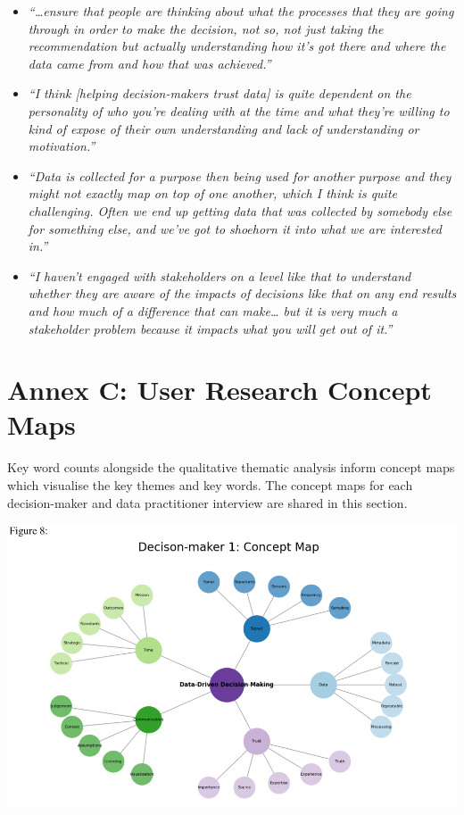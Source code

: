 \documentclass{article}
\begin{document}
\begin{itemize}
{  reduction technique has on the on the decision.''}
\item
  \emph{``\ldots ensure that people are thinking about what the
  processes that they are going through in order to make the decision,
  not so, not just taking the recommendation but actually understanding
  how it's got there and where the data came from and how that was
  achieved.''}
\item
  \emph{``I think {[}helping decision-makers trust data{]} is quite
  dependent on the personality of who you're dealing with at the time
  and what they're willing to kind of expose of their own understanding
  and lack of understanding or motivation.''}
\item
  \emph{``Data is collected for a purpose then being used for another
  purpose and they might not exactly map on top of one another, which I
  think is quite challenging. Often we end up getting data that was
  collected by somebody else for something else, and we've got to
  shoehorn it into what we are interested in.''}
\item
  \emph{``I haven't engaged with stakeholders on a level like that to
  understand whether they are aware of the impacts of decisions like
  that on any end results and how much of a difference that can
  make\ldots{} but it is very much a stakeholder problem because it
  impacts what you will get out of it.''}
\end{itemize}

\newpage

\hypertarget{annex-c-user-research-concept-maps}{%
\section{Annex C: User Research Concept
Maps}\label{annex-c-user-research-concept-maps}}

\vspace{-0.4cm}

Key word counts alongside the qualitative thematic analysis inform
concept maps which visualise the key themes and key words. The concept
maps for each decision-maker and data practitioner interview are shared
in this section.

\includegraphics{210431461_CSC8639_Dissertation_files/figure-latex/unnamed-chunk-4-1.pdf}
\end{document}
